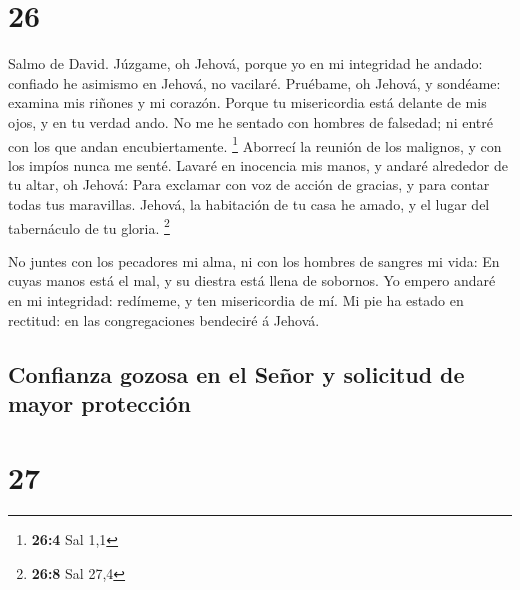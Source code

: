 \hypertarget{section-25}{%
\section{26}\label{section-25}}

 Salmo de David. Júzgame, oh Jehová, porque yo en mi
integridad he andado: confiado he asimismo en Jehová, no vacilaré.
 Pruébame, oh Jehová, y sondéame: examina mis riñones y mi
corazón.  Porque tu misericordia está delante de mis ojos, y
en tu verdad ando.  No me he sentado con hombres de
falsedad; ni entré con los que andan encubiertamente. \footnote{\textbf{26:4}
  Sal 1,1}  Aborrecí la reunión de los malignos, y con los
impíos nunca me senté.  Lavaré en inocencia mis manos, y
andaré alrededor de tu altar, oh Jehová:  Para exclamar con
voz de acción de gracias, y para contar todas tus maravillas.
 Jehová, la habitación de tu casa he amado, y el lugar del
tabernáculo de tu gloria. \footnote{\textbf{26:8} Sal 27,4}

 No juntes con los pecadores mi alma, ni con los hombres de
sangres mi vida:  En cuyas manos está el mal, y su diestra
está llena de sobornos.  Yo empero andaré en mi integridad:
redímeme, y ten misericordia de mí.  Mi pie ha estado en
rectitud: en las congregaciones bendeciré á Jehová.

\hypertarget{confianza-gozosa-en-el-seuxf1or-y-solicitud-de-mayor-protecciuxf3n}{%
\subsection{Confianza gozosa en el Señor y solicitud de mayor
protección}\label{confianza-gozosa-en-el-seuxf1or-y-solicitud-de-mayor-protecciuxf3n}}

\hypertarget{section-26}{%
\section{27}\label{section-26}}

